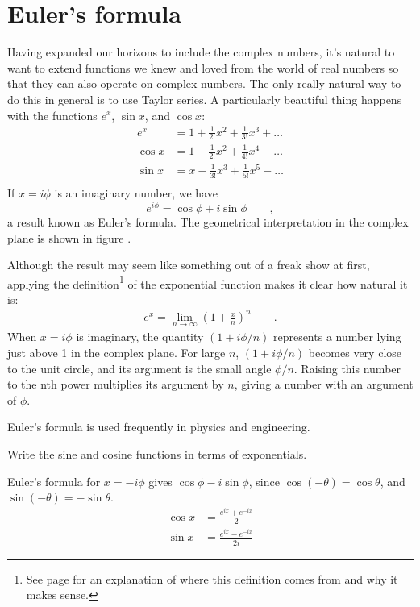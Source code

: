 \section{Euler's formula}

Having expanded our horizons to include the complex numbers, it's natural to want to extend
functions we knew and loved from the world of real numbers so that they can also operate on
complex numbers. The only really natural way to do this in general is to use Taylor series.
A particularly beautiful thing happens with the functions $e^x$, $\sin x$, and $\cos x$:
\begin{align*}
  e^x    &= 1 + \frac{1}{2!}x^2 + \frac{1}{3!}x^3 + \ldots \\
  \cos x &= 1 - \frac{1}{2!}x^2 + \frac{1}{4!}x^4 - \ldots \\
  \sin x &= x - \frac{1}{3!}x^3 + \frac{1}{5!}x^5 - \ldots \\
\end{align*}
If $x=i\phi$ is an imaginary number, we have
\begin{equation*}
  e^{i\phi} = \cos \phi + i \sin \phi \qquad ,
\end{equation*}
a result known as Euler's formula.
The geometrical interpretation in the complex
plane is shown in figure .


Although the result may seem like something out of a freak show at first,
applying the definition\footnote{See page \pageref{definition-of-exp} for an explanation
of where this definition comes from and why it makes sense.} of the exponential function
makes it clear how natural it is:
\begin{align*}
  e^x = \lim_{n\rightarrow \infty} \left(1+\frac{x}{n}\right)^n \qquad .
\end{align*}
When $x=i\phi$ is imaginary, the quantity $(1+i\phi/n)$ represents a number
lying just above 1 in the complex plane. For large $n$, $(1+i\phi/n)$
becomes very close to the unit circle, and its argument is the small
angle $\phi/n$. Raising this number to the nth power multiplies its
argument by $n$, giving a number with an argument of $\phi$.


Euler's formula is used frequently in physics and engineering.

\begin{eg}
\egquestion Write the sine and cosine functions in terms of exponentials.

\eganswer Euler's formula for $x=-i\phi$ gives $\cos \phi - i \sin \phi$,
since $\cos(-\theta)=\cos\theta$, and $\sin(-\theta)=-\sin\theta$.
\begin{align*}
  \cos x &= \frac{e^{ix}+e^{-ix}}{2} \\
  \sin x &= \frac{e^{ix}-e^{-ix}}{2i} 
\end{align*}
\end{eg}

